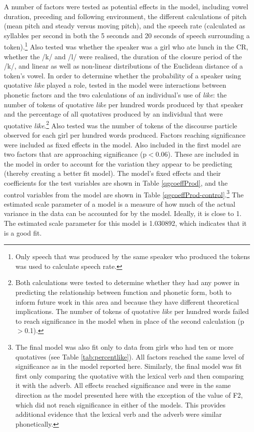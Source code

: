 A number of factors were tested as potential effects in the model, including vowel duration, preceding and following environment, the different calculations of pitch (mean pitch and steady versus moving pitch), and the speech rate (calculated as syllables per second in both the 5 seconds and 20 seconds of speech surrounding a token).\footnote{Only speech that was produced by the same speaker who produced the tokens was used to calculate speech rate.}  Also tested was whether the speaker was a girl who ate lunch in the CR, whether the /k/ and /l/ were realised, the duration of the closure period of the /k/, and linear as well as non-linear distributions of the Euclidean distance of a token's vowel.  In order to determine whether the probability of a speaker using quotative \textit{like} played a role, tested in the model were interactions between phonetic factors and the two calculations of an individual's use of \textit{like}: the number of tokens of quotative \textit{like} per hundred words produced by that speaker and the percentage of all quotatives produced by an individual that were quotative \textit{like}.\footnote{Both calculations were tested to determine whether they had any power in predicting the relationship between function and phonetic form, both to inform future work in this area and because they have different theoretical implications.  The number of tokens of quotative \textit{like} per hundred words failed to reach significance in the model when in place of the second calculation (p$>$0.1).}  Also tested was the number of tokens of the discourse particle observed for each girl per hundred words produced.  Factors reaching significance were included as fixed effects in the model.  Also included in the first model are two factors that are approaching significance (p$<$0.06).  These are included in the model in order to account for the variation they appear to be predicting (thereby creating a better fit model).  The model's fixed effects and their coefficients for the test variables are shown in Table \ref{qgcoeffProd}, and the control variables from the model are shown in Table \ref{qgcoeffProd-control}.\footnote{The final model was also fit only to data from girls who had ten or more quotatives (see Table \ref{tab:percentlike}).  All factors reached the same level of significance as in the model reported here.  Similarly, the final model was fit first only comparing the quotative with the lexical verb and then comparing it with the adverb.  All effects reached significance and were in the same direction as the model presented here with the exception of the value of F2, which did not reach significance in either of the models.  This provides additional evidence that the lexical verb and the adverb were similar phonetically.}  The estimated scale parameter of a model is a measure of how much of the actual variance in the data can be accounted for by the model.  Ideally, it is close to 1.  The estimated scale parameter for this model is 1.030892, which indicates that it is a good fit.
 

